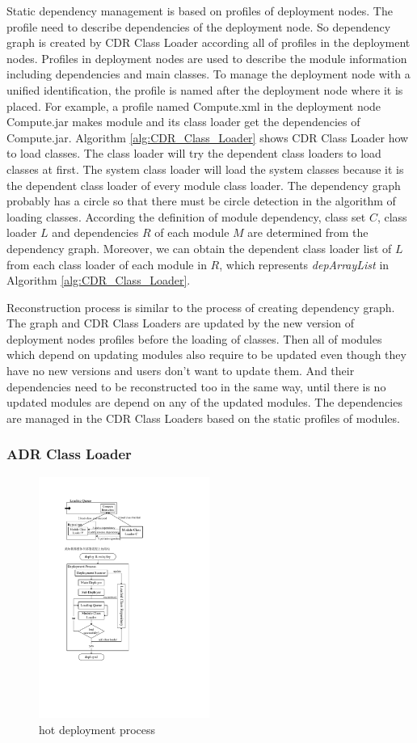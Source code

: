 \documentclass[conference]{IEEEtran}
\begin{document}
Static dependency management is based on profiles of deployment nodes. 
The profile need to describe dependencies of the deployment node. 
So dependency graph is created by CDR Class Loader according all of profiles in the deployment nodes. 
Profiles in deployment nodes are used to describe the module information including dependencies and main classes. 
To manage the deployment node with a unified identification, the profile is named after the deployment node where it is placed. 
For example, a profile named Compute.xml in the deployment node Compute.jar makes module and its class loader get the dependencies of Compute.jar.
Algorithm \ref{alg:CDR_Class_Loader} shows CDR Class Loader how to load classes. 
The class loader will try the dependent class loaders to load classes at first. 
The system class loader will load the system classes because it is the dependent class loader of every module class loader. 
The dependency graph probably has a circle so that there must be circle detection in the algorithm of loading classes. 
According the definition of module dependency, class set $C$, class loader $L$ and dependencies $R$ of each module $M$ are determined from the dependency graph. 
Moreover, we can obtain the dependent class loader list of $L$ from each class loader of each module in $R$, which represents \emph{depArrayList} in Algorithm \ref{alg:CDR_Class_Loader}. 

Reconstruction process is similar to the process of creating dependency graph. 
The graph and CDR Class Loaders are updated by the new version of deployment nodes profiles before the loading of classes. 
Then all of modules which depend on updating modules also require to be updated even though they have no new versions and users don’t want to update them. 
And their dependencies need to be reconstructed too in the same way, until there is no updated modules are depend on any of the updated modules. 
The dependencies are managed in the CDR Class Loaders based on the static profiles of modules.



\subsubsection{ADR Class Loader}

\begin{figure}[!t]
\centering
\includegraphics[width=2.2in]{DeploymentProcess.pdf}
\caption{hot deployment process}
\label{fig:deployment_process}
\end{figure}
\end{document}
